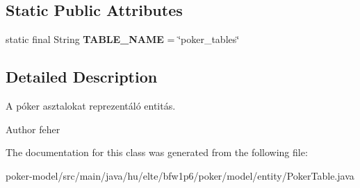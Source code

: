 \subsection*{Static Public Attributes}
\begin{DoxyCompactItemize}
\item 
\hypertarget{classhu_1_1elte_1_1bfw1p6_1_1poker_1_1model_1_1entity_1_1_poker_table_a7564a404d01e4026fac3fcb77a6db203}{}static final String {\bfseries T\+A\+B\+L\+E\+\_\+\+N\+A\+M\+E} = \char`\"{}poker\+\_\+tables\char`\"{}\label{classhu_1_1elte_1_1bfw1p6_1_1poker_1_1model_1_1entity_1_1_poker_table_a7564a404d01e4026fac3fcb77a6db203}

\end{DoxyCompactItemize}


\subsection{Detailed Description}
A póker asztalokat reprezentáló entitás. \begin{DoxyAuthor}{Author}
feher 
\end{DoxyAuthor}


The documentation for this class was generated from the following file\+:\begin{DoxyCompactItemize}
\item 
poker-\/model/src/main/java/hu/elte/bfw1p6/poker/model/entity/Poker\+Table.\+java\end{DoxyCompactItemize}
